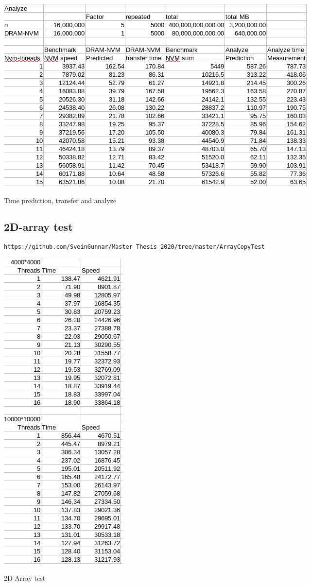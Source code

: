 \documentclass[12pt,a4paper,USenglish]{article}      %
\begin{document}
\begin{table}[!hbtp]
\includegraphics[scale=0.7]{Analyze_prediction_NVM.png}
\caption{Time prediction, transfer and analyze}
\end{table}

\clearpage
\subsection{2D-array test}
\begin{lstlisting}[caption=Kildekode]
https://github.com/SveinGunnar/Master_Thesis_2020/tree/master/ArrayCopyTest
\end{lstlisting}
\begin{table}[!hbtp]
\includegraphics[scale=0.7]{2D_array_test.png}
\caption{2D-Array test}
\end{table}
\end{document}
